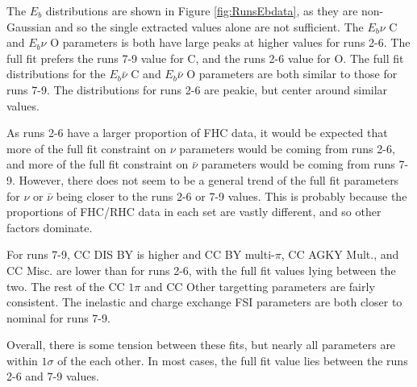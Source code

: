 The $E_b$ distributions are shown in Figure \ref{fig:RunsEbdata}, as they are non-Gaussian and so the single extracted values alone are not sufficient. The $E_b \nu$ C and $E_b \nu$ O parameters is both have large peaks at higher values for runs 2-6. The full fit prefers the runs 7-9 value for C, and the runs 2-6 value for O. The full fit distributions for the $E_b \bar{\nu}$ C and $E_b \bar{\nu}$ O parameters are both similar to those for runs 7-9. The distributions for runs 2-6 are peakie, but center around similar values.

As runs 2-6 have a larger proportion of FHC data, it would be expected that more of the full fit constraint on $\nu$ parameters would be coming from runs 2-6, and more of the full fit constraint on $\bar{\nu}$ parameters would be coming from runs 7-9. However, there does not seem to be a general trend of the full fit parameters for $\nu$ or $\bar{\nu}$ being closer to the runs 2-6 or 7-9 values. This is probably because the proportions of FHC/RHC data in each set are vastly different, and so other factors dominate.

For runs 7-9, CC DIS BY is higher and CC BY multi-$\pi$, CC AGKY Mult., and CC Misc. are lower than for runs 2-6, with the full fit values lying between the two. The rest of the CC $1\pi$ and CC Other targetting parameters are fairly consistent. The inelastic and charge exchange FSI parameters are both closer to nominal for runs 7-9.

Overall, there is some tension between these fits, but nearly all parameters are within $1\sigma$ of the each other. In most cases, the full fit value lies between the runs 2-6 and 7-9 values.

